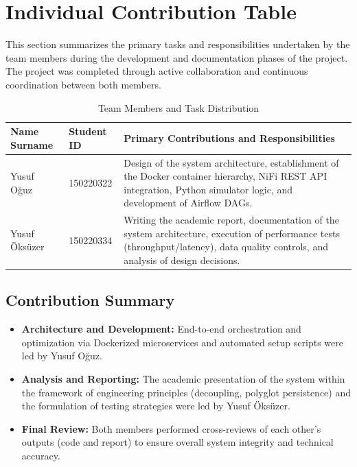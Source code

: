 \documentclass[conference]{IEEEtran}
\begin{document}
\section{Individual Contribution Table}

This section summarizes the primary tasks and responsibilities undertaken by the team members during the development and documentation phases of the project. The project was completed through active collaboration and continuous coordination between both members.

\begin{table}[h!]
\centering
\renewcommand{\arraystretch}{1.3}
\footnotesize

\begin{tabularx}{\linewidth}{|p{2.8cm}|p{2.2cm}|X|}
\hline
\textbf{Name Surname} & \textbf{Student ID} & \textbf{Primary Contributions and Responsibilities} \\ \hline

Yusuf Oğuz & 150220322 &
Design of the system architecture, establishment of the Docker container hierarchy, NiFi REST API integration, Python simulator logic, and development of Airflow DAGs.
\\ \hline

Yusuf Öksüzer & 150220334 &
Writing the academic report, documentation of the system architecture, execution of performance tests (throughput/latency), data quality controls, and analysis of design decisions.
\\ \hline

\end{tabularx}

\caption{Team Members and Task Distribution}
\end{table}

\subsection{Contribution Summary}
\begin{itemize}
    \item \textbf{Architecture and Development:} End-to-end orchestration and optimization via Dockerized microservices and automated setup scripts were led by Yusuf Oğuz.
    \item \textbf{Analysis and Reporting:} The academic presentation of the system within the framework of engineering principles (decoupling, polyglot persistence) and the formulation of testing strategies were led by Yusuf Öksüzer.
    \item \textbf{Final Review:} Both members performed cross-reviews of each other's outputs (code and report) to ensure overall system integrity and technical accuracy.
\end{itemize}
\end{document}
